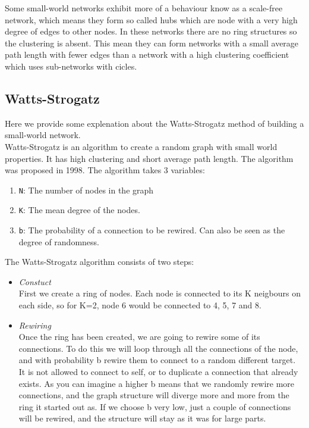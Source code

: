 \documentclass[a4paper]{article}
\theoremstyle{definition}
\begin{document}
Some small-world networks exhibit more of a behaviour know as a scale-free
network, which means they form so called hubs which are node with a very
high degree of edges to other nodes. In these networks there are no ring
structures so the clustering is absent. This mean they can form networks
with a small average path length with fewer edges than a network with a high
clustering coefficient which uses sub-networks with cicles.\\

\newpage
\subsection{Watts-Strogatz}
Here we provide some explenation about the Watts-Strogatz method of building
a small-world network.\\

Watts-Strogatz is an algorithm to create a random graph with small world properties. It has high clustering and short average path length. The algorithm was proposed in 1998.
The algorithm takes 3 variables:\\

\begin{enumerate}
 \item \texttt{N}: The number of nodes in the graph
 \item \texttt{K}: The mean degree of the nodes. 
 \item \texttt{b}: The probability of a connection to be rewired. Can also be seen as the degree of randomness. 
\end{enumerate}

The Watts-Strogatz algorithm consists of two steps:\\

\begin{itemize}
  \item \emph{Constuct}\\
    First we create a ring of nodes. Each node is connected to its K neigbours on each side, so for K=2, node 6 would be connected to 4, 5, 7 and 8.
  \item \emph{Rewiring}\\
    Once the ring has been created, we are going to rewire some of its connections. To do this we will loop through all the connections of the node, and with probability b rewire them to connect to a random different target. It is not allowed to connect to self, or to duplicate a connection that already exists. As you can imagine a higher b means that we randomly rewire more connections, and the graph structure will diverge more and more from the ring it started out as. If we choose b very low, just a couple of connections will be rewired, and the structure will stay as it was for large parts. 
\end{itemize}
\end{document}
